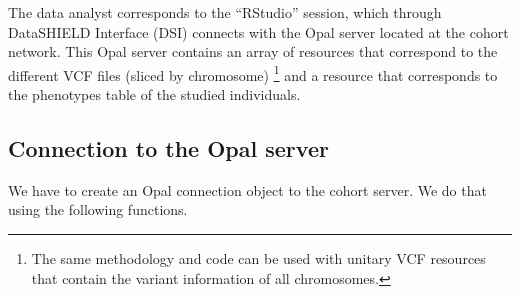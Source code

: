\documentclass[
]{book}
\newenvironment{Shaded}{\begin{snugshade}}{\end{snugshade}}
\newcommand{\AttributeTok}[1]{\textcolor[rgb]{0.77,0.63,0.00}{#1}}
\newcommand{\FunctionTok}[1]{\textcolor[rgb]{0.00,0.00,0.00}{#1}}
\newcommand{\NormalTok}[1]{#1}
\newcommand{\OtherTok}[1]{\textcolor[rgb]{0.56,0.35,0.01}{#1}}
\newcommand{\SpecialCharTok}[1]{\textcolor[rgb]{0.00,0.00,0.00}{#1}}
\newcommand{\StringTok}[1]{\textcolor[rgb]{0.31,0.60,0.02}{#1}}
\begin{document}
The data analyst corresponds to the ``RStudio'' session, which through DataSHIELD Interface (DSI) connects with the Opal server located at the cohort network. This Opal server contains an array of resources that correspond to the different VCF files (sliced by chromosome) \footnote{The same methodology and code can be used with unitary VCF resources that contain the variant information of all chromosomes.} and a resource that corresponds to the phenotypes table of the studied individuals.

\hypertarget{connection-to-the-opal-server}{%
\subsection{Connection to the Opal server}\label{connection-to-the-opal-server}}

We have to create an Opal connection object to the cohort server. We do that using the following functions.

\begin{Shaded}
\end{Shaded}
\end{document}
